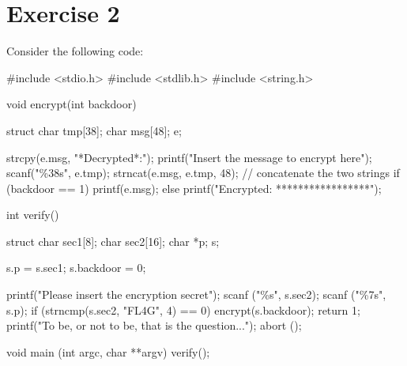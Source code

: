 \section{Exercise 2}

Consider the following code: 
\begin{verbnobox}[\verbarg]
#include <stdio.h>
#include <stdlib.h>
#include <string.h>

void encrypt(int backdoor){
    struct{
        char tmp[38];
        char msg[48];
    } e;

    strcpy(e.msg, "*Decrypted*:");
    printf("Insert the message to encrypt here\n");
    scanf("\%38s", e.tmp);
    strncat(e.msg, e.tmp, 48); // concatenate the two strings
    if (backdoor == 1){
        printf(e.msg);
    }else{
        printf("Encrypted: *****************\n");
    }
}

int verify(){
    struct{
        char sec1[8];
        char sec2[16];
        char *p;
    } s;

    s.p = s.sec1;
    s.backdoor = 0;

    printf("Please insert the encryption secret\n");
    scanf ("\%s", s.sec2);
    scanf ("\%7s", s.p);
    if (strncmp(s.sec2, "FL4G", 4) == 0) {
        encrypt(s.backdoor);
        return 1;
    }
    printf("To be, or not to be, that is the question...\n");
    abort ();
}

void main (int argc, char **argv){
    verify();
}
\end{verbnobox}
